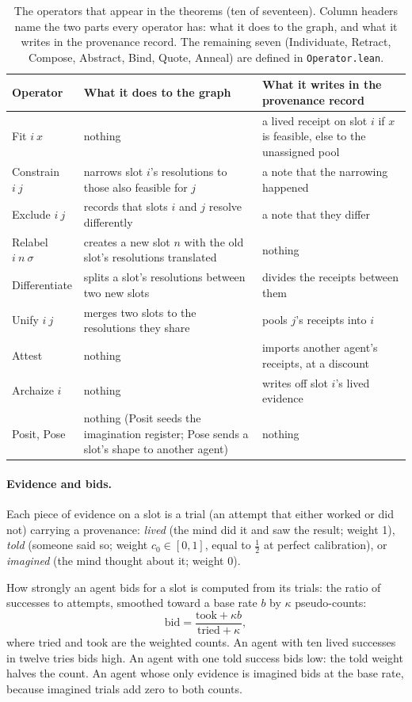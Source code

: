 \documentclass[11pt]{article}
\newcommand{\leanus}{\textunderscore\allowbreak}
\newcommand{\lean}[1]{{\let\_\leanus\texttt{#1}}}
\theoremstyle{remark}
\begin{document}
\begin{table}[t]
\centering
\small
\begin{tabular}{@{}lp{6.2cm}p{5.2cm}@{}}
\toprule
Operator & What it does to the graph & What it writes in the provenance record \\
\midrule
Fit $i\ x$ & nothing & a lived receipt on slot $i$ if $x$ is feasible, else to the
unassigned pool \\
Constrain $i\ j$ & narrows slot $i$'s resolutions to those also feasible for $j$ & a note
that the narrowing happened \\
Exclude $i\ j$ & records that slots $i$ and $j$ resolve differently & a note that
they differ \\
Relabel $i\ n\ \sigma$ & creates a new slot $n$ with the old slot's resolutions translated &
nothing \\
Differentiate & splits a slot's resolutions between two new slots & divides the receipts between
them \\
Unify $i\ j$ & merges two slots to the resolutions they share & pools $j$'s receipts into $i$ \\
Attest & nothing & imports another agent's receipts, at a discount \\
Archaize $i$ & nothing & writes off slot $i$'s lived evidence \\
Posit, Pose & nothing (Posit seeds the imagination register; Pose sends a slot's shape to
another agent) & nothing \\
\bottomrule
\end{tabular}
\caption{The operators that appear in the theorems (ten of seventeen). Column headers name
the two parts every operator has: what it does to the graph, and what it writes in the
provenance record. The remaining seven (Individuate, Retract, Compose, Abstract, Bind, Quote, Anneal)
are defined in \lean{Operator.lean}.}
\label{tab:operators}
\end{table}

\paragraph{Evidence and bids.} Each piece of evidence on a slot is a trial (an attempt
that either worked or did not) carrying a provenance: \emph{lived} (the mind did it and
saw the result; weight 1), \emph{told} (someone said so; weight $c_0 \in [0,1]$,
equal to $\tfrac{1}{2}$ at perfect calibration), or \emph{imagined} (the mind thought
about it; weight 0).

How strongly an agent bids for a slot is computed from its trials: the ratio of successes
to attempts, smoothed toward a base rate $b$ by $\kappa$ pseudo-counts:
\begin{equation}
\label{eq:bid}
\mathrm{bid} = \frac{\mathrm{took} + \kappa b}{\mathrm{tried} + \kappa},
\end{equation}
where $\mathrm{tried}$ and $\mathrm{took}$ are the weighted counts. An agent with ten
lived successes in twelve tries bids high. An agent with one told success bids low: the
told weight halves the count. An agent whose only evidence is imagined bids at the base
rate, because imagined trials add zero to both counts.
\end{document}
